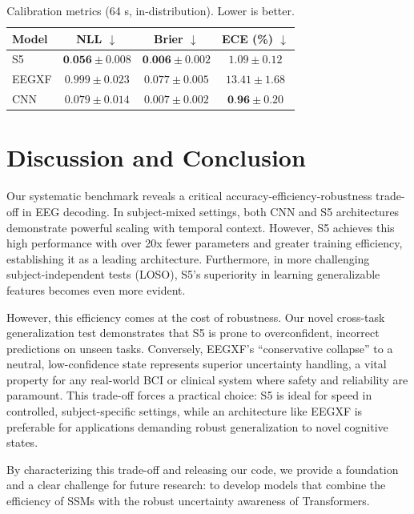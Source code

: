 \documentclass{article}
\newcommand{\eegtrans}{EEGXF}
\begin{document}
\begin{table}[h]
\centering
\caption{Calibration metrics (64 s, in-distribution). Lower is better.}
\label{tab:calibration}
\begin{tabular}{lccc}
\toprule
Model & NLL $\downarrow$ & Brier $\downarrow$ & ECE (\%) $\downarrow$ \\
\midrule
S5    & $\textbf{0.056} \pm 0.008$ & $\textbf{0.006} \pm 0.002$ & $1.09 \pm 0.12$ \\
EEGXF & $0.999 \pm 0.023$ & $0.077 \pm 0.005$ & $13.41 \pm 1.68$ \\
CNN   & $0.079 \pm 0.014$ & $0.007 \pm 0.002$ & $\textbf{0.96} \pm 0.20$ \\
\bottomrule
\end{tabular}
\end{table}

\section{Discussion and Conclusion}
\label{sec:conclusion}

Our systematic benchmark reveals a critical accuracy-efficiency-robustness trade-off in EEG decoding. In subject-mixed settings, both CNN and S5 architectures demonstrate powerful scaling with temporal context. However, S5 achieves this high performance with over 20x fewer parameters and greater training efficiency, establishing it as a leading architecture. Furthermore, in more challenging subject-independent tests (LOSO), S5's superiority in learning generalizable features becomes even more evident.



However, this efficiency comes at the cost of robustness. Our novel cross-task generalization test demonstrates that S5 is prone to overconfident, incorrect predictions on unseen tasks. Conversely, \eegtrans's ``conservative collapse'' to a neutral, low-confidence state represents superior uncertainty handling, a vital property for any real-world BCI or clinical system where safety and reliability are paramount. This trade-off forces a practical choice: S5 is ideal for speed in controlled, subject-specific settings, while an architecture like \eegtrans{} is preferable for applications demanding robust generalization to novel cognitive states.

By characterizing this trade-off and releasing our code, we provide a foundation and a clear challenge for future research: to develop models that combine the efficiency of SSMs with the robust uncertainty awareness of Transformers.

\clearpage


\end{document}
